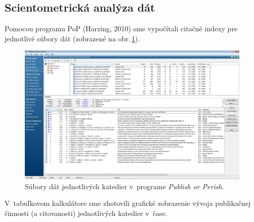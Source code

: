 \subsection{Scientometrická analýza dát}

Pomocou programu PoP (Harzing, 2010) sme vypočítali citačné indexy pre
jednotlivé súbory dát (zobrazené na obr.\,\ref{fig:pop.departmentfiles}).

\begin{figure}
  \centering
  \includegraphics[width=\textwidth]{obr/publish-or-perish.jpg}
  \caption{Súbory dát jednotlivých katedier v~programe \emph{Publish or
      Perish}.}
  \label{fig:pop.departmentfiles}
\end{figure}

V~tabuľkovom kalkulátore sme zhotovili grafické zobrazenie vývoja publikačnej
činnosti (a citovanosti) jednotlivých katedier v~čase.

